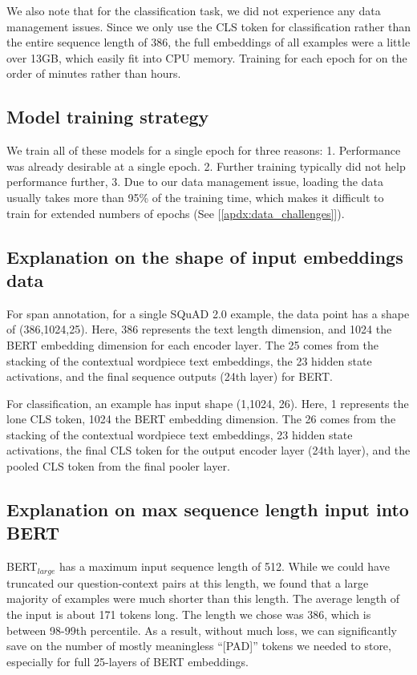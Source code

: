 We also note that for the classification task, we did not experience any data management issues. Since we only use the CLS token for classification rather than the entire sequence length of 386, the full embeddings of all examples were a little over 13GB, which easily fit into CPU memory. Training for each epoch for on the order of minutes rather than hours.

\subsection{Model training strategy}
\label{apdx:model_training_strategy}

We train all of these models for a single epoch for three reasons: 1. Performance was already desirable at a single epoch. 2. Further training typically did not help performance further, 3. Due to our data management issue, loading the data usually takes more than 95\% of the training time, which makes it difficult to train for extended numbers of epochs (See [\ref{apdx:data_challenges}]). 

\subsection{Explanation on the shape of input embeddings data}
\label{apdx:explanation_of_input_embeddings_shape}

For span annotation, for a single SQuAD 2.0 example, the data point has a shape of (386,1024,25). Here, 386 represents the text length dimension, and 1024 the BERT embedding dimension for each encoder layer. The 25 comes from the stacking of the contextual wordpiece \cite{DBLP:journals/corr/WuSCLNMKCGMKSJL16} text embeddings, the 23 hidden state activations, and the final sequence outputs (24th layer) for BERT. 

For classification, an example has input shape (1,1024, 26). Here, 1 represents the lone CLS token, 1024 the BERT embedding dimension. The 26 comes from the stacking of the contextual wordpiece text embeddings, 23 hidden state activations, the final CLS token for the output encoder layer (24th layer), and the pooled CLS token from the final pooler layer.

\subsection{Explanation on max sequence length input into BERT}
\label{apdx:explanation_max_sequence_length}

BERT$_{large}$ has a maximum input sequence length of 512. While we could have truncated our question-context pairs at this length, we found that a large majority of examples were much shorter than this length. The average length of the input is about 171 tokens long. The length we chose was 386, which is between 98-99th percentile. As a result, without much loss, we can significantly save on the number of mostly meaningless “[PAD]” tokens we needed to store, especially for full 25-layers of BERT embeddings.

